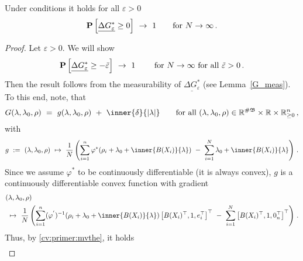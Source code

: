  \begin{lemma}
   \label{bw:cd:lem2}
   Under conditions it holds
   for all $\varepsilon>0$
\begin{gather}
   \P
   \left[ 
     \underline{
     \Delta G^*
     _\varepsilon
     }
     \ge 
     0
   \right]
   \ 
   \to
   \ 
   1
   \qquad
   \text{for}
   \ 
   N\to\infty
   \,.
\end{gather}
 \end{lemma}
 \begin{proof}
   Let $\varepsilon>0$.
   We will show
\begin{gather}
   \P
   \left[ 
     \underline{
     \Delta G^*
     _\varepsilon
     }
     \ge 
     -\tilde{\varepsilon}
   \right]
   \ 
   \to
   \ 
   1
   \qquad
   \ 
   \text{for}
   \ 
   N\to\infty
   \ 
   \text{for all}\ 
   \tilde{\varepsilon}>0
   \,.
\end{gather}
Then the result follows from the measurability of 
$
     \underline{
     \Delta G^*
     _\varepsilon
     }
$
(see Lemma~\ref{G_meas}).
To this end, note, that
\begin{gather*}
  G(\lambda,\lambda_0,\rho)
  \ 
  =
  \ 
  g(\lambda,\lambda_0,\rho)
  \ 
  +
  \ 
  \inner{\delta}{|\lambda|}
  \qquad
  \text{for all}\ 
  (\lambda,\lambda_0,\rho)
  \in
  \R^{\#\mathfrak{B}}
  \times
  \R
  \times
  \R^n_{\ge 0}
  \,,
\end{gather*}
with
\begin{gather*}
  g
  \ 
  :=
  \ 
  (\lambda,\lambda_0,\rho)
  \ 
  \mapsto
  \ 
     \frac{1}{N}
     \left( 
\sum_{i=1} 
  ^n
  \varphi^*
  \!
  \left( 
    \rho_i
    +
\lambda_0
+
\inner
{B(X_i)}
{
\lambda
}
  \right)
  \ 
  -
\ 
\sum_{i=1}^{N} 
\lambda_0
+
\inner
{B(X_i)}
{
\lambda
}
     \right)
  \,.
\end{gather*}
Since we assume $\varphi^*$ to be continuously differentiable (it is always convex),
$g$ is a continuously differentiable convex function with gradient
\begin{align*}
  &
  (\lambda,\lambda_0,\rho)
  \\
  &
  \ 
  \mapsto
  \ 
     \frac{1}{N}
     \left( 
\sum_{i=1} 
  ^n
  (
  \varphi^{'}
  )
  ^{-1}
  \!
  \left( 
    \rho_i
    +
\lambda_0
+
\inner
{B(X_i)}
{
\lambda
}
  \right)
  \left[ 
    B(X_i)^\top,1,e_i^\top
  \right]^\top
  \ 
  -
  \ 
  \sum_{i=1}^{N} 
  \left[ 
    B(X_i)^\top,1,0_n^\top
  \right]^\top
     \right)
  \,.
\end{align*}
Thus, by \eqref{cv:primer:mvthe},
it holds
\begin{align*}

\end{align*}
\end{proof}
